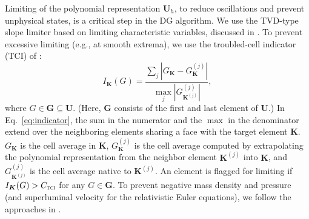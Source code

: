 \documentclass[letterpaper]{jpconf}
\newcommand{\vect}[1]{\boldsymbol{#1}}
\newcommand{\f}[2]{\frac{#1}{#2}}
\newcommand{\bK}{\vect{K}}
\newcommand{\TCI}{\textnormal{\tiny\textsc{TCI}}}
\begin{document}
Limiting of the polynomial representation $\vect{U}_{h}$, to reduce oscillations and prevent unphysical states, is a critical step in the DG algorithm.  
We use the TVD-type slope limiter based on limiting characteristic variables, discussed in \cite{cockburnShu_1998}.  
To prevent excessive limiting (e.g., at smooth extrema), we use the troubled-cell indicator (TCI) of \cite{fuShu_2017}:
\begin{equation}
  I_{\bK}(G) = \f{\sum_{j}|G_{\bK}-G_{\bK}^{(j)}|}{\max_{j}|G_{\bK^{(j)}}^{(j)}|},
  \label{eq:indicator}
\end{equation}
where $G\in\vect{G}\subseteq\vect{U}$.  
(Here, $\vect{G}$ consists of the first and last element of $\vect{U}$.)  
In Eq.~\eqref{eq:indicator}, the sum in the numerator and the $\max$ in the denominator extend over the neighboring elements sharing a face with the target element $\bK$.  
$G_{\bK}$ is the cell average in $\bK$, $G_{\bK}^{(j)}$ is the cell average computed by extrapolating the polynomial representation from the neighbor element $\bK^{(j)}$ into $\bK$, and $G_{\bK^{(j)}}^{(j)}$ is the cell average native to $\bK^{(j)}$.  
An element is flagged for limiting if $I_{\bK}(G)>C_{\TCI}$ for any $G\in\vect{G}$.  
To prevent negative mass density and pressure (and superluminal velocity for the relativistic Euler equations), we follow the approaches in \cite{zhangShu_2010,wuTang_2015,qin_etal_2016}.  
\end{document}
